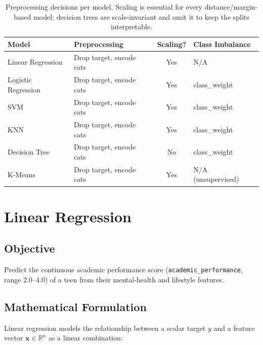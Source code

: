 \documentclass[11pt,a4paper]{article}
\begin{document}
\begin{table}[H]
    \centering
    \begin{tabularx}{\linewidth}{lXcX}
        \toprule
        \textbf{Model} & \textbf{Preprocessing} & \textbf{Scaling?} & \textbf{Class Imbalance} \\
        \midrule
        Linear Regression  & Drop target, encode cats & Yes & N/A \\
        Logistic Regression & Drop target, encode cats & Yes & class\_weight \\
        SVM                 & Drop target, encode cats & Yes & class\_weight \\
        KNN                 & Drop target, encode cats & Yes & class\_weight \\
        Decision Tree       & Drop target, encode cats & No  & class\_weight \\
        K-Means             & Drop target, encode cats & Yes & N/A (unsupervised) \\
        \bottomrule
    \end{tabularx}
    \caption{Preprocessing decisions per model. Scaling is essential for every
    distance/margin-based model; decision trees are scale-invariant and omit it
    to keep the splits interpretable.}
    \label{tab:preproc}
\end{table}

\newpage
\section{Linear Regression}

\subsection{Objective}
Predict the continuous academic performance score (\texttt{academic\_performance},
range 2.0--4.0) of a teen from their mental-health and lifestyle features.

\subsection{Mathematical Formulation}

Linear regression models the relationship between a scalar target $y$ and a
feature vector $\mathbf{x} \in \mathbb{R}^n$ as a linear combination:
\end{document}
